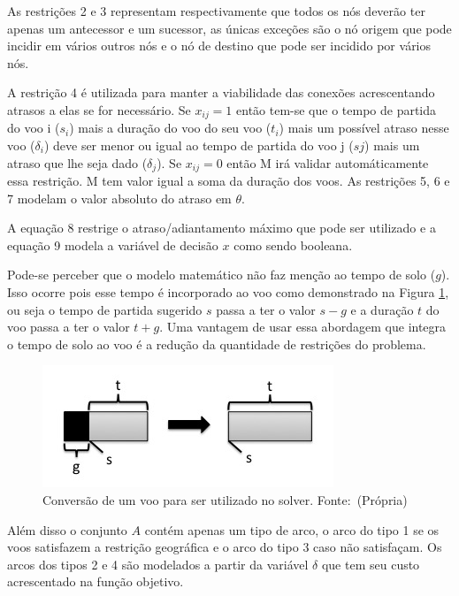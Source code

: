 As restrições 2 e 3 representam respectivamente que todos os nós deverão
ter apenas um antecessor e um sucessor, as únicas exceções são o nó origem que
pode incidir em vários outros nós e o nó de destino que pode ser incidido por
vários nós.

A restrição 4 é utilizada para manter a viabilidade das conexões acrescentando
atrasos a elas se for necessário. Se $x_{ij} = 1$ então tem-se que o tempo de
partida do voo i ($s_{i}$) mais a duração do voo do seu voo ($t_{i}$) mais um
possível atraso nesse voo ($\delta_{i}$) deve ser menor ou igual ao tempo de
partida do voo j ($s{j}$) mais um atraso que lhe seja dado ($\delta_{j}$). Se
$x_{ij} = 0$ então M irá validar automáticamente essa restrição. M tem valor
igual a soma da duração dos voos. As restrições 5, 6 e 7 modelam o valor
absoluto do atraso em $\theta$.

A equação 8 restrige o atraso/adiantamento máximo que pode ser utilizado e a
equação 9 modela a variável de decisão $x$ como sendo booleana.

Pode-se perceber que o modelo matemático não faz menção ao tempo de solo ($g$).
Isso ocorre pois esse tempo é incorporado ao voo como demonstrado na Figura
\ref{fig:conversion}, ou seja o tempo de partida sugerido $s$ passa a ter o
valor $s - g$ e a duração $t$ do voo passa a ter o valor $t + g$. Uma vantagem
de usar essa abordagem que integra o tempo de solo ao voo é a redução da
quantidade de restrições do problema. 



\begin{figure}[ht]
	\caption{Conversão de um voo para ser utilizado no
	solver. \newline \mbox{Fonte: (Própria)}}\label{fig:conversion}
	\includegraphics[scale=0.4]{./img/conversion}
	
\end{figure}

Além disso o conjunto $A$ contém apenas um tipo de arco, o arco do tipo 1 se os
voos satisfazem a restrição geográfica e o arco do tipo 3 caso não satisfaçam.
Os arcos dos tipos 2 e 4 são modelados a partir  da variável $\delta$ que tem
seu custo acrescentado na função objetivo.

